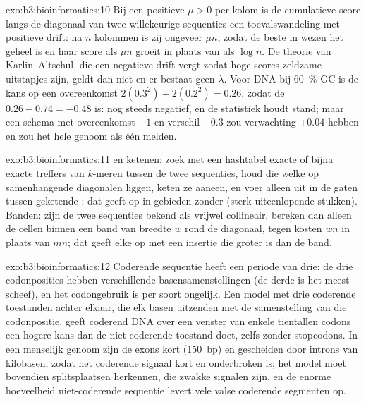 \begin{solution}{exo:b3:bioinformatics:10}
Bij een positieve  $\mu > 0$ per kolom is de cumulatieve
score langs de diagonaal van twee willekeurige sequenties een
toevalswandeling met positieve drift: na $n$ kolommen is zij ongeveer
$\mu n$, zodat de beste  in wezen het geheel is en
haar score als $\mu n$ groeit in plaats van als $\log n$. De theorie
van Karlin--Altschul, die een negatieve drift vergt zodat hoge scores
zeldzame uitstapjes zijn, geldt dan niet en er bestaat geen $\lambda$.
Voor DNA bij \qty{60}{\%} GC is de kans op een overeenkomst
$2(0.3^{2}) + 2(0.2^{2}) = 0.26$, zodat de 
$0.26 - 0.74 = -0.48$ is: nog steeds negatief, en de statistiek houdt
stand; maar een schema met overeenkomst $+1$ en verschil $-0.3$ zou
verwachting $+0.04$ hebben en zou het hele genoom als één 
melden.
\end{solution}

\begin{solution}{exo:b3:bioinformatics:11}
 en ketenen: zoek met een hashtabel exacte of bijna exacte
treffers van $k$-meren tussen de twee sequenties, houd die welke op
samenhangende diagonalen liggen, keten ze aaneen, en voer  alleen uit in de gaten tussen geketende ; dat geeft
 op in gebieden zonder  (sterk uiteenlopende stukken).
Banden: zijn de twee sequenties bekend als vrijwel collineair, bereken
dan alleen de cellen binnen een band van breedte $w$ rond de diagonaal,
tegen kosten $wn$ in plaats van $mn$; dat geeft elke  op met
een insertie die groter is dan de band.
\end{solution}

\begin{solution}{exo:b3:bioinformatics:12}
Coderende sequentie heeft een periode van drie: de drie codonposities
hebben verschillende basensamenstellingen (de derde is het meest
scheef), en het codongebruik is per soort ongelijk. Een model met drie
coderende toestanden achter elkaar, die elk basen uitzenden met de
samenstelling van die codonpositie, geeft coderend DNA over een venster
van enkele tientallen codons een hogere kans dan de niet-coderende
toestand doet, zelfs zonder stopcodons. In een menselijk genoom zijn de
exons kort (\qty{150}{bp}) en gescheiden door introns van kilobasen,
zodat het coderende signaal kort en onderbroken is; het model moet
bovendien splitsplaatsen herkennen, die zwakke signalen zijn, en de
enorme hoeveelheid niet-coderende sequentie levert vele valse coderende
segmenten op.
\end{solution}

